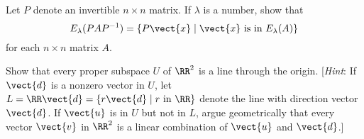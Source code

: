 \begin{multicols}{2}
\begin{ex}
\begin{sol}
\begin{enumerate}[label={\alph*.}]
\end{enumerate}
\end{sol}
\end{ex}

\begin{ex}
Let $P$ denote an invertible $n \times n$ matrix. If $\lambda$ is a number, show that 
\begin{equation*}
E_{\lambda}(PAP^{-1}) = \{P\vect{x} \mid \vect{x} \mbox{ is in } E_{\lambda}(A)\}
\end{equation*}
for each $n \times n$ matrix $A$.
\end{ex}

\begin{ex}\label{ex:5_1_24}
Show that every proper subspace $U$ of $\RR^2$ is a line through the origin. [\textit{Hint}: If $\vect{d}$ is a nonzero vector in $U$, let $L = \RR \vect{d} = \{r\vect{d} \mid r \mbox{ in }\RR\}$ denote the line with direction vector $\vect{d}$. If $\vect{u}$ is in $U$ but not in $L$, argue geometrically that every vector $\vect{v}$ in $\RR^2$ is a linear combination of $\vect{u}$ and $\vect{d}$.]
\end{ex}
\end{multicols}
